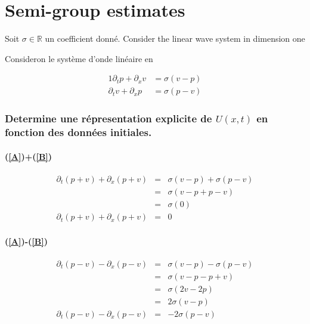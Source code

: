 \documentclass[a4paper,11pt]{article}
\begin{document}
\part{Semi-group estimates}
Soit \( \sigma \in \mathbb{R} \) un coefficient donné. Consider the linear wave system in dimension one

Consideron le système d'onde linéaire en 

\renewcommand{\theequation}{\Alph{equation}}

\begin{alignat}{1}
    \partial_{t}p + \partial_{x}v &= \sigma(v-p) \label{A} \\
    \partial_{t}v + \partial_{x}p &= \sigma(p-v) \label{B}
\end{alignat}

\setcounter{equation}{0}
\renewcommand{\theequation}{\arabic{equation}}

\section{Determine une répresentation explicite de \( U(x, t) \) en fonction des données initiales.}
\subsection*{(\ref{A})+(\ref{B})}

\begin{equation*}
    \begin{array}{rcl}
        \partial_{t}(p+v) + \partial_{x}(p+v) &=& \sigma(v-p) + \sigma(p-v) \\
        &=& \sigma(v-p + p-v) \\
        &=& \sigma(0) \\
        \partial_{t}(p+v) + \partial_{x}(p+v) &=& 0
    \end{array}
\end{equation*}

\subsection*{(\ref{A})-(\ref{B})}

\begin{equation*}
\begin{array}{rcl}
    \partial_{t}(p-v) - \partial_{x}(p-v) &=& \sigma(v-p) - \sigma(p-v) \\
    &=& \sigma(v-p - p+v) \\    
    &=& \sigma(2v-2p) \\
    &=& 2\sigma(v-p) \\
    \partial_{t}(p-v) - \partial_{x}(p-v) &=& -2\sigma(p-v)
\end{array}
\end{equation*}
\end{document}
